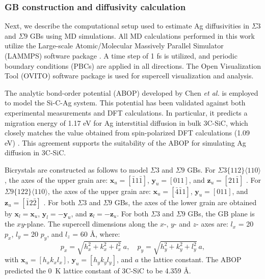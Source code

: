 \documentclass[%
preprint,
amsmath,amssymb,
aps,
]{revtex4-2}
\newcommand{\?}{\stackrel{?}{=}}
\begin{document}

\subsubsection{GB construction and diffusivity calculation}

Next, we describe the computational setup used to estimate Ag diffusivities in $\Sigma 3$ and $\Sigma 9$ GBs using MD simulations. All MD calculations performed in this work utilize the Large-scale Atomic/Molecular Massively Parallel Simulator (LAMMPS) software package \cite{Thompson2022}. A time step of 1 fs is utilized, and periodic boundary conditions (PBCs) are applied in all directions. The Open Visualization Tool (OVITO) software package \cite{Stukowski2010} is used for supercell visualization and analysis.

The analytic bond-order potential (ABOP) developed by Chen \textit{et al.} \cite{Chen2019} is employed to model the Si-C-Ag system. This potential has been validated against both experimental measurements and DFT calculations. In particular, it predicts a migration energy of 1.17 eV for Ag interstitial diffusion in bulk 3C-SiC, which closely matches the value obtained from spin-polarized DFT calculations (1.09 eV) \cite{Peng2019}. This agreement supports the suitability of the ABOP for simulating Ag diffusion in 3C-SiC.

Bicrystals are constructed as follows to model $\Sigma 3$ and $\Sigma 9$ GBs. For $\Sigma 3 \{112\} \langle 110 \rangle$, the axes of the upper grain are: $\mathbf{x}_u = [ \bar{1} 1 \bar{1} ]$, $\mathbf{y}_u = [011]$, and $\mathbf{z}_u = [2 1 \bar{1}]$ \cite{Kohyama1994}. For $\Sigma 9 \{ 122 \} \langle 110 \rangle$, the axes of the upper grain are: $\mathbf{x}_u = [\bar{4} \bar{1} 1]$, $\mathbf{y}_u = [011]$, and $\mathbf{z}_u = [\bar{1} 2 \bar{2}]$ \cite{Kohyama1991}. For both $\Sigma 3$ and $\Sigma 9$ GBs, the axes of the lower grain are obtained by $\mathbf{x}_l = \mathbf{x}_u$, $\mathbf{y}_l = - \mathbf{y}_u$, and $\mathbf{z}_l = - \mathbf{z}_u$. For both $\Sigma 3$ and $\Sigma 9$ GBs, the GB plane is the $xy$-plane. The supercell dimensions along the $x$-, $y$- and $z$- axes are: $l_x$ = 20 $p_x$, $l_y$ = 20 $p_y$, and $l_z$ = 60 {\AA}, where:
\begin{equation}
p_x = \sqrt{ h_x^2+ k_x^2 + l_x^2 } \ a, \quad p_y = \sqrt{ h_y^2+ k_y^2 + l_y^2 } \ a,
\end{equation}
with $\mathbf{x}_u = [h_x k_x l_x]$, $\mathbf{y}_u = [h_y k_y l_y]$, and $a$ the lattice constant. The ABOP predicted the 0~K lattice constant of 3C-SiC to be 4.359 {\AA}.
\end{document}
